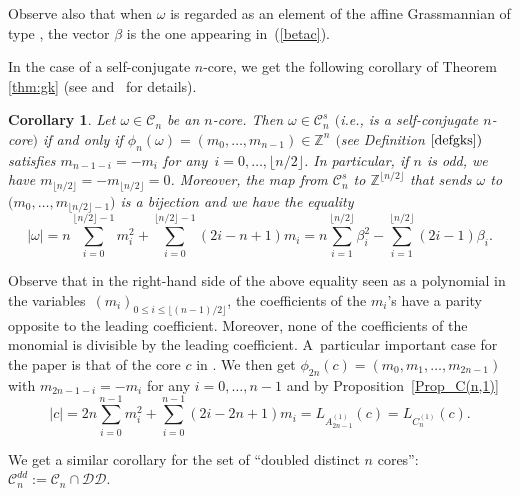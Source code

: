 \documentclass[10pt,a4paper]{amsart}
\newtheorem{Corollary}[Theorem]{Corollary}
\numberwithin{equation}{section}
\newcommand{\cC}{\mathcal{C}}
\def\ccdd{\mathcal {DD}}
\newcommand{\Z}{\mathbb{Z}}
\begin{document}
\begin{Remark}
	Observe also that when $\omega $ is regarded as an element of the affine
	Grassmannian of type , the vector $\beta $ is the one appearing
	in~(\ref{betac}).
\end{Remark}

In the case of a self-conjugate $n$-core, we get the following corollary of
Theorem \ref{thm:gk} (see \mbox{\cite[Sections~$7$ and~$8$]{GKS}} and~\cite[Section $%
4.1$]{Wmac} for details).

\begin{Corollary}\label{cor:gksc} Let $\omega \in \cC_{n}$ be an $n$-core. Then $\omega \in \cC_{n}^{s}$ $($i.e., is a self-conjugate $n$-core$)$ if and only if
    $\phi_{n}(\omega )=(m_{0},\dots ,m_{n-1})\in \Z^{n}$ $($see Definition $\ref{defgks})$ satisfies $m_{n-1-i}=-m_{i}$ for any~${i=0,\dots ,\lfloor n/2\rfloor}$. In
	particular, if $n$ is odd, we have $m_{\lfloor n/2\rfloor }=-m_{\lfloor
		n/2\rfloor }=0$. Moreover, the map from $\cC_{n}^{s}$ to $\Z^{\lfloor
		n/2\rfloor }$ that sends $\omega $ to $\bigl(m_{0},\dots ,m_{\lfloor n/2\rfloor
		-1}\bigr)$ is a bijection and we have the equality
	\begin{equation*}
	\lvert \omega \rvert =n\sum_{i=0}^{\lfloor n/2\rfloor
		-1}m_{i}^{2}+\sum_{i=0}^{\lfloor n/2\rfloor
		-1}(2i-n+1)m_{i}=n\sum_{i=1}^{\lfloor n/2\rfloor }\beta
	_{i}^{2}-\sum_{i=1}^{\lfloor n/2\rfloor }(2i-1)\beta _{i}.
	\end{equation*}
\end{Corollary}

Observe that in the right-hand side of the above equality seen as a polynomial in the variables~$(m_i)_{0\leq i \leq \lfloor (n-1)/2\rfloor }$,
 the coefficients of the $m_{i}$'s have a parity opposite to the leading coefficient.
Moreover, none of the coefficients of the monomial is divisible by the
leading coefficient. A~particular important case for the paper is that of
the core $c$ in . We then get ${\phi
_{2n}(c)=(m_{0},m_{1},\dots ,m_{2n-1})}$ with $m_{2n-1-i}=-m_{i}$ for any $%
i=0,\dots ,n-1$ and by Proposition~\ref{Prop_C(n,1)}
\begin{equation}
\lvert c\rvert
=2n\sum_{i=0}^{n-1}m_{i}^{2}+%
\sum_{i=0}^{n-1}(2i-2n+1)m_{i}=L_{A_{2n-1}^{(1)}}(c)=L_{C_{n}^{(1)}}(c).
\label{eq:Lc}
\end{equation}



We get a similar corollary for the set of ``doubled distinct $n$ cores'': $\cC%
_{n}^{dd}:=\cC_{n}\cap \ccdd$.
\end{document}
